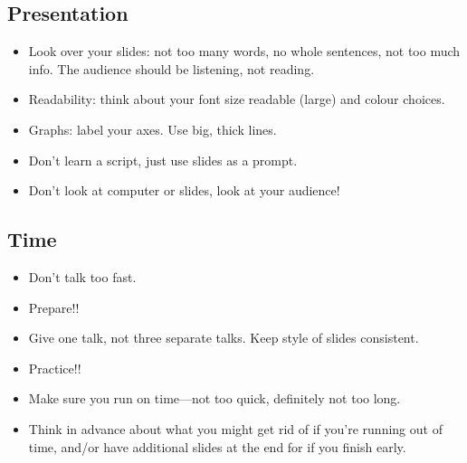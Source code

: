 \documentclass[12pt, a4paper]{article}
\theoremstyle{definition}
\theoremstyle{remark}
\numberwithin{equation}{section}
\begin{document}
\subsection{Presentation}
\begin{itemize}
\item Look over your slides: not too many words, no whole sentences,
not too much info. The audience should be listening, not reading.
\item Readability: think about your font size readable (large) and colour choices.
\item Graphs: label your axes. Use big, thick lines.
\item Don't learn a script, just use slides as a prompt.
\item Don't look at computer or slides, look at your audience!
\end{itemize}

\subsection{Time}
\begin{itemize}
\item Don't talk too fast.
\item Prepare!! 
\item Give one talk, not three separate talks. Keep style of slides consistent.
\item Practice!! 
\item Make sure you run on time---not too quick, definitely not too long. 
\item Think in advance about what you might get rid of if you're running out
of time, and/or have additional slides at the end for if you finish early. 
\end{itemize}
\end{document}
